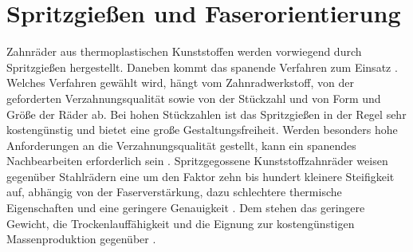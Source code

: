 
\section{Spritzgießen und Faserorientierung}
\label{sec:spritzgiessen}

Zahnräder aus thermoplastischen Kunststoffen werden vorwiegend durch Spritzgießen hergestellt. Daneben kommt das spanende Verfahren zum Einsatz \cite[S.~25]{VDI2736-1}. Welches Verfahren gewählt wird, hängt vom Zahnradwerkstoff, von der geforderten Verzahnungsqualität sowie von der Stückzahl und von Form und Größe der Räder ab. Bei hohen Stückzahlen ist das Spritzgießen in der Regel sehr kostengünstig und bietet eine große Gestaltungsfreiheit. Werden besonders hohe Anforderungen an die Verzahnungsqualität gestellt, kann ein spanendes Nachbearbeiten erforderlich sein \cite[S.~25]{VDI2736-1}. Spritzgegossene Kunststoffzahnräder weisen gegenüber Stahlrädern eine um den Faktor zehn bis hundert kleinere Steifigkeit auf, abhängig von der Faserverstärkung, dazu schlechtere thermische Eigenschaften und eine geringere Genauigkeit \cite[S.~1]{FVA856-I}. Dem stehen das geringere Gewicht, die Trockenlauffähigkeit und die Eignung zur kostengünstigen Massenproduktion gegenüber \cite[S.~1]{FVA856-I}.

